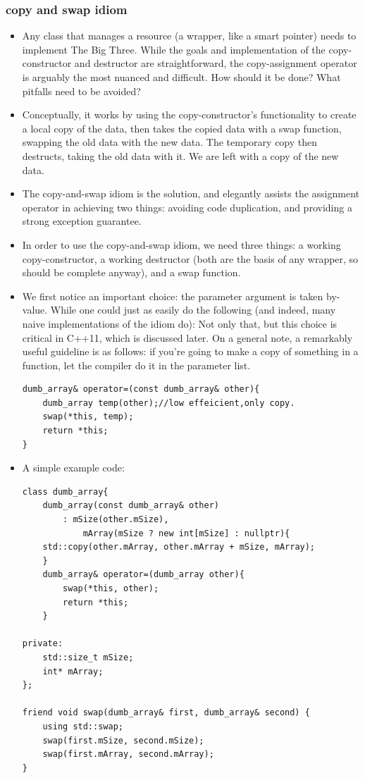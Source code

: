 \documentclass[a4paper,11pt,twoside]{book}
\begin{document}
\subsubsection{copy and swap idiom}
\begin{itemize}
	\item Any class that manages a resource (a wrapper, like a smart pointer) needs to implement The Big Three. While the goals and implementation of the copy-constructor and destructor are straightforward, the copy-assignment operator is arguably the most nuanced and difficult. How should it be done? What pitfalls need to be avoided?
	
	\item Conceptually, it works by using the copy-constructor's functionality to create a local copy of the data, then takes the copied data with a swap function, swapping the old data with the new data. The temporary copy then destructs, taking the old data with it. We are left with a copy of the new data.
	
	\item The copy-and-swap idiom is the solution, and elegantly assists the assignment operator in achieving two things: avoiding code duplication, and providing a strong exception guarantee.
	
	\item In order to use the copy-and-swap idiom, we need three things: a working copy-constructor, a working destructor (both are the basis of any wrapper, so should be complete anyway), and a swap function.
	
	\item We first notice an important choice: the parameter argument is taken by-value. While one could just as easily do the following (and indeed, many naive implementations of the idiom do): Not only that, but this choice is critical in C++11, which is discussed later. On a general note, a remarkably useful guideline is as follows: if you're going to make a copy of something in a function, let the compiler do it in the parameter list.
	
\begin{lstlisting}[numbers=none]
dumb_array& operator=(const dumb_array& other){
	dumb_array temp(other);//low effeicient,only copy.
	swap(*this, temp);
	return *this;
}
\end{lstlisting}

\item A simple example code:
\begin{lstlisting}[numbers=none]
class dumb_array{
	dumb_array(const dumb_array& other)
		: mSize(other.mSize),
			mArray(mSize ? new int[mSize] : nullptr){
	std::copy(other.mArray, other.mArray + mSize, mArray);
	}
	dumb_array& operator=(dumb_array other){
		swap(*this, other); 
		return *this;
	}

private:
	std::size_t mSize;
	int* mArray;
};

friend void swap(dumb_array& first, dumb_array& second) {
	using std::swap;
	swap(first.mSize, second.mSize);
	swap(first.mArray, second.mArray);
}

\end{lstlisting}
\end{itemize}
	
\end{document}
